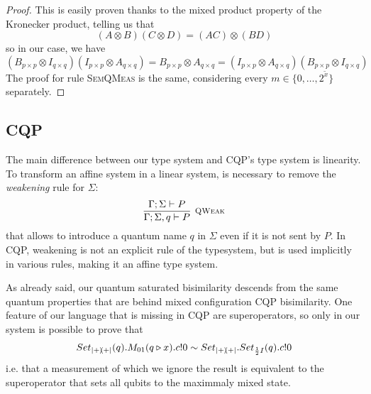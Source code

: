 \begin{proof}
	This is easily proven thanks to the mixed product property of the Kronecker product, telling us that 
	\[ (A \otimes B)(C \otimes D) = (AC)\otimes(BD)
	\]
	so in our case, we have 
	\[
	(B_{p\times p} \otimes I_{q\times q}) (I_{p\times p} \otimes A_{q\times q}) = B_{p\times p} \otimes A_{q \times q} = (I_{p\times p} \otimes A_{q\times q}) (B_{p\times p} \otimes I_{q\times q})
	\]	
The proof for rule {\scshape SemQMeas} is the same, considering every $m \in \{0, \dots, 2^{\widetilde{x}}\}$ separately.
\end{proof}



\subsection{CQP}
The main difference between our type system and CQP's type system is linearity. 
To transform an affine system in a linear system, is necessary to remove the \textit{weakening} rule for $\Sigma$:
\[ \infer[\mbox{\footnotesize\scshape QWeak}]{\Gamma; \Sigma,q \vdash P}{\Gamma; \Sigma \vdash P}
\]
that allows to introduce a quantum name $q$ in $\Sigma$ even if it is not sent by $P$. In CQP, weakening is not an explicit rule of the typesystem, but is used implicitly in various rules, making it an affine type system.

As already said, our quantum saturated bisimilarity descends from the same quantum properties that are behind mixed configuration CQP bisimilarity. One feature of our language that is missing in CQP are superoperators, so only in our system is possible to prove that 
\begin{align*}
	Set_{\ket{+}\!\!\bra{+}}(q).M_{01}(q \triangleright x).c!0 \sim Set_{\ket{+}\!\!\bra{+}}.Set_{\frac{1}{2} I}(q).c!0
\end{align*}
i.e. that a measurement of which we ignore the result is equivalent to the superoperator that sets all qubits to the maximmaly mixed state.